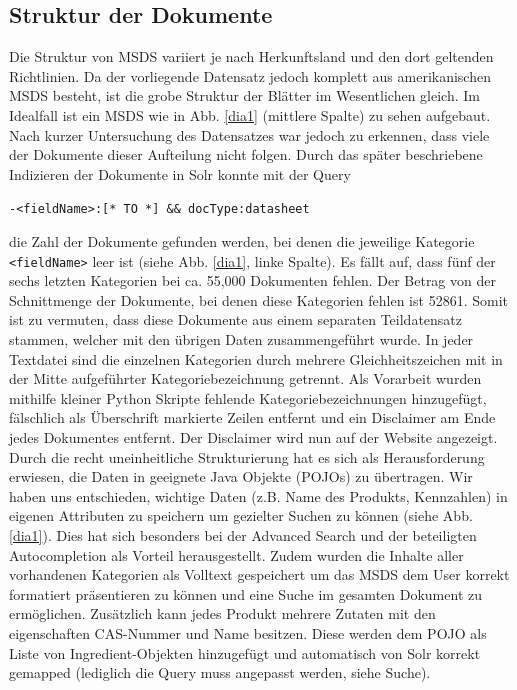 \documentclass[oneside, a4paper, 12pt, titlepage]{article}
\begin{document}
\subsection{Struktur der Dokumente}
Die Struktur von MSDS variiert je nach Herkunftsland und den dort geltenden Richtlinien. Da der vorliegende Datensatz jedoch komplett aus amerikanischen MSDS besteht, ist die grobe Struktur der Blätter im Wesentlichen gleich. Im Idealfall ist ein MSDS wie in Abb. \ref{dia1} (mittlere Spalte) zu sehen aufgebaut. Nach kurzer Untersuchung des Datensatzes war jedoch zu erkennen, dass viele der Dokumente dieser Aufteilung nicht folgen. Durch das später beschriebene Indizieren der Dokumente in Solr konnte mit der Query
\begin{center}\texttt{-<fieldName>:[* TO *] \&\& docType:datasheet} \end{center}
die Zahl der Dokumente gefunden werden, bei denen die jeweilige Kategorie \texttt{<fieldName>} leer ist (siehe Abb. \ref{dia1}, linke Spalte). Es fällt auf, dass fünf der sechs letzten Kategorien bei ca. 55,000 Dokumenten fehlen. Der Betrag von der Schnittmenge der Dokumente, bei denen diese Kategorien fehlen ist 52861. Somit ist zu vermuten, dass diese Dokumente aus einem separaten Teildatensatz stammen, welcher mit den übrigen Daten zusammengeführt wurde.
In jeder Textdatei sind die einzelnen Kategorien durch mehrere Gleichheitszeichen mit in der Mitte aufgeführter Kategoriebezeichnung getrennt.
Als Vorarbeit wurden mithilfe kleiner Python Skripte fehlende Kategoriebezeichnungen hinzugefügt, fälschlich als Überschrift markierte Zeilen entfernt und ein Disclaimer am Ende jedes Dokumentes entfernt. Der Disclaimer wird nun auf der Website angezeigt.
Durch die recht uneinheitliche Strukturierung hat es sich als Herausforderung erwiesen, die Daten in geeignete Java Objekte (POJOs) zu übertragen.
Wir haben uns entschieden, wichtige Daten (z.B. Name des Produkts, Kennzahlen) in eigenen Attributen zu speichern um gezielter Suchen zu können (siehe Abb. \ref{dia1}).
Dies hat sich besonders bei der Advanced Search und der beteiligten Autocompletion als Vorteil herausgestellt. Zudem wurden die Inhalte aller vorhandenen Kategorien als Volltext gespeichert um das MSDS dem User korrekt formatiert präsentieren zu können und eine Suche im gesamten Dokument zu ermöglichen.
Zusätzlich kann jedes Produkt mehrere Zutaten mit den eigenschaften CAS-Nummer und Name besitzen. Diese werden dem POJO als Liste von Ingredient-Objekten hinzugefügt und automatisch von Solr korrekt gemapped (lediglich die Query muss angepasst werden, siehe Suche).
\end{document}
